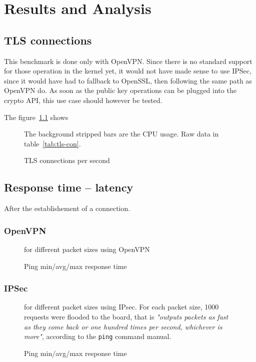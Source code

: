 \chapter{Results and Analysis}\label{chap:results}

\section{TLS connections}

This benchmark is done only with OpenVPN.
Since there is no standard support for those operation in the kernel yet, it would not have made sense to use IPSec, since it would have had to fallback to OpenSSL, then following the same path as OpenVPN do.
As soon as the public key operations can be plugged into the crypto API, this use case should however be tested.

The figure~\ref{fig:openvpn-tls-bench} shows

\begin{figure}[ht]
\center

\caption{TLS connections per second}{The background stripped bars are the CPU usage. Raw data in table~\ref{tab:tls-con}.}
\label{fig:openvpn-tls-bench}
\end{figure}


\section{Response time -- latency}
After the establishement of a connection.

\subsection{OpenVPN}

\begin{figure}[ht]

\caption{Ping min/avg/max response time}{for different packet sizes using OpenVPN}
\label{fig:ping-benchmark-openvpn}
\end{figure}

\subsection{IPSec}

\begin{figure}[ht]

\caption{Ping min/avg/max response time}{for different packet sizes using IPsec. For each packet size, 1000 requests were flooded to the board, that is \textit{"outputs packets as fast as they come back or one hundred times per second, whichever is more"}, according to the \texttt{ping} command manual.} %
\label{fig:ping-benchmark-ipsec}
\end{figure}



